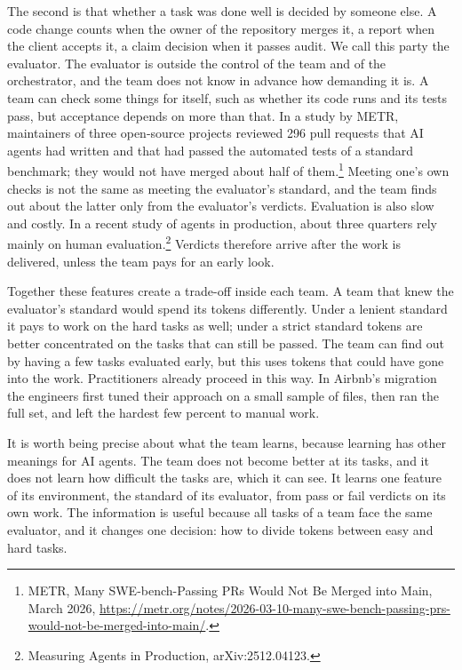 \documentclass[11pt]{article}
\begin{document}
The second is that whether a task was done well is decided by someone else. A code change counts when the owner of the repository merges it, a report when the client accepts it, a claim decision when it passes audit. We call this party the evaluator. The evaluator is outside the control of the team and of the orchestrator, and the team does not know in advance how demanding it is. A team can check some things for itself, such as whether its code runs and its tests pass, but acceptance depends on more than that. In a study by METR, maintainers of three open-source projects reviewed 296 pull requests that AI agents had written and that had passed the automated tests of a standard benchmark; they would not have merged about half of them.\footnote{METR, Many SWE-bench-Passing PRs Would Not Be Merged into Main, March 2026, \url{https://metr.org/notes/2026-03-10-many-swe-bench-passing-prs-would-not-be-merged-into-main/}.} Meeting one's own checks is not the same as meeting the evaluator's standard, and the team finds out about the latter only from the evaluator's verdicts. Evaluation is also slow and costly. In a recent study of agents in production, about three quarters rely mainly on human evaluation.\footnote{Measuring Agents in Production, arXiv:2512.04123.} Verdicts therefore arrive after the work is delivered, unless the team pays for an early look.

Together these features create a trade-off inside each team. A team that knew the evaluator's standard would spend its tokens differently. Under a lenient standard it pays to work on the hard tasks as well; under a strict standard tokens are better concentrated on the tasks that can still be passed. The team can find out by having a few tasks evaluated early, but this uses tokens that could have gone into the work. Practitioners already proceed in this way. In Airbnb's migration the engineers first tuned their approach on a small sample of files, then ran the full set, and left the hardest few percent to manual work.

It is worth being precise about what the team learns, because learning has other meanings for AI agents. The team does not become better at its tasks, and it does not learn how difficult the tasks are, which it can see. It learns one feature of its environment, the standard of its evaluator, from pass or fail verdicts on its own work. The information is useful because all tasks of a team face the same evaluator, and it changes one decision: how to divide tokens between easy and hard tasks.
\end{document}
